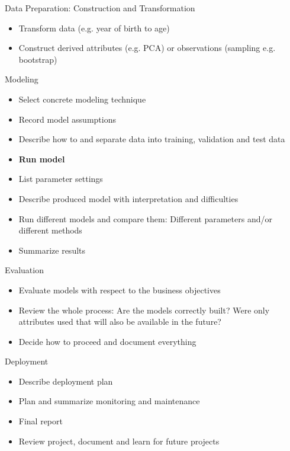 \documentclass{beamer}
\begin{document}
		\begin{frame}{Data Preparation: Construction and Transformation}
			\begin{itemize}
				\item Transform data (e.g. year of birth to age)
				\item Construct derived attributes (e.g. PCA) or observations (sampling e.g. bootstrap)
			\end{itemize}
		\end{frame}	
	
	\begin{frame}{Modeling}
		\begin{itemize}
			\item Select concrete modeling technique
			\item Record model assumptions
			\item Describe how to and separate data into training, validation and test data 
			\item \textbf{Run model}
			\item List parameter settings
			\item Describe produced model with interpretation and difficulties
			\item Run different models and compare them: Different parameters and/or different methods 
			\item Summarize results
		\end{itemize}
	\end{frame}

	\begin{frame}{Evaluation}
		\begin{itemize}
			\item Evaluate models with respect to the business objectives
			\item Review the whole process: Are the models correctly built? Were only attributes used that will also be available in the future?
			\item Decide how to proceed and document everything
		\end{itemize}
	\end{frame}

	\begin{frame}{Deployment}
		\begin{itemize}
			\item Describe deployment plan
			\item Plan and summarize monitoring and maintenance
			\item Final report
			\item Review project, document and learn for future projects
		\end{itemize}
	\end{frame}	
\end{document}
